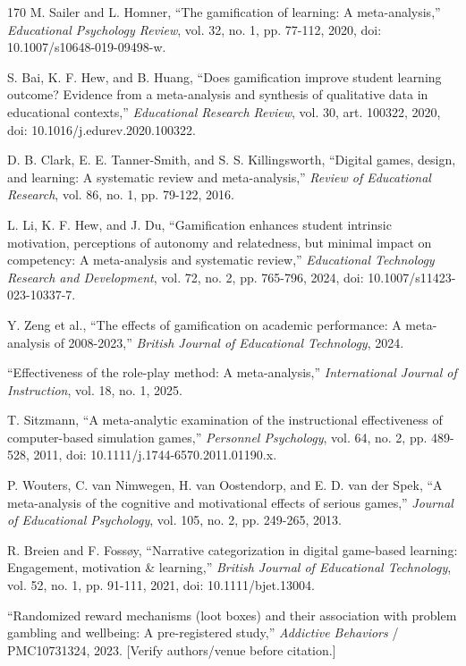 \begin{thebibliography}{170}
 M. Sailer and L. Homner, ``The gamification of learning: A meta-analysis,'' \textit{Educational Psychology Review}, vol. 32, no. 1, pp. 77-112, 2020, doi: 10.1007/s10648-019-09498-w.

 S. Bai, K. F. Hew, and B. Huang, ``Does gamification improve student learning outcome? Evidence from a meta-analysis and synthesis of qualitative data in educational contexts,'' \textit{Educational Research Review}, vol. 30, art. 100322, 2020, doi: 10.1016/j.edurev.2020.100322.

 D. B. Clark, E. E. Tanner-Smith, and S. S. Killingsworth, ``Digital games, design, and learning: A systematic review and meta-analysis,'' \textit{Review of Educational Research}, vol. 86, no. 1, pp. 79-122, 2016.

 L. Li, K. F. Hew, and J. Du, ``Gamification enhances student intrinsic motivation, perceptions of autonomy and relatedness, but minimal impact on competency: A meta-analysis and systematic review,'' \textit{Educational Technology Research and Development}, vol. 72, no. 2, pp. 765-796, 2024, doi: 10.1007/s11423-023-10337-7.

 Y. Zeng et al., ``The effects of gamification on academic performance: A meta-analysis of 2008-2023,'' \textit{British Journal of Educational Technology}, 2024.

 ``Effectiveness of the role-play method: A meta-analysis,'' \textit{International Journal of Instruction}, vol. 18, no. 1, 2025.

 T. Sitzmann, ``A meta-analytic examination of the instructional effectiveness of computer-based simulation games,'' \textit{Personnel Psychology}, vol. 64, no. 2, pp. 489-528, 2011, doi: 10.1111/j.1744-6570.2011.01190.x.

 P. Wouters, C. van Nimwegen, H. van Oostendorp, and E. D. van der Spek, ``A meta-analysis of the cognitive and motivational effects of serious games,'' \textit{Journal of Educational Psychology}, vol. 105, no. 2, pp. 249-265, 2013.

 R. Breien and F. Fossøy, ``Narrative categorization in digital game-based learning: Engagement, motivation \& learning,'' \textit{British Journal of Educational Technology}, vol. 52, no. 1, pp. 91-111, 2021, doi: 10.1111/bjet.13004.

 ``Randomized reward mechanisms (loot boxes) and their association with problem gambling and wellbeing: A pre-registered study,'' \textit{Addictive Behaviors} / PMC10731324, 2023. [Verify authors/venue before citation.]


\end{thebibliography}
